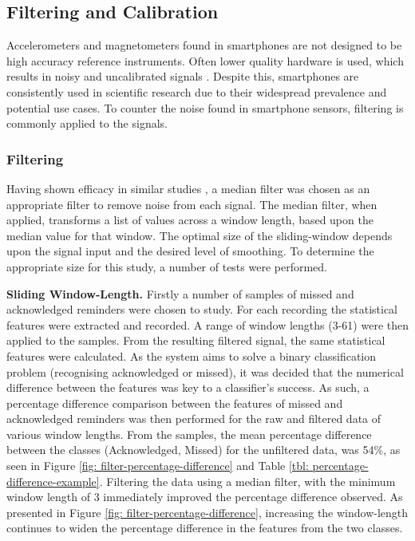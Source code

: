 \subsection{Filtering and Calibration}
Accelerometers and magnetometers found in smartphones are not designed to be high accuracy reference instruments. Often lower quality hardware is used, which results in noisy and uncalibrated signals \cite{Mitchell2013}. Despite this, smartphones are consistently used in scientific research due to their widespread prevalence and potential use cases. To counter the noise found in smartphone sensors, filtering is commonly applied to the signals.

\subsubsection{Filtering}
Having shown efficacy in similar studies \cite{Xia2011}, a median filter was chosen as an appropriate filter to remove noise from each signal. The median filter, when applied, transforms a list of values across a window length, based upon the median value for that window. The optimal size of the sliding-window depends upon the signal input and the desired level of smoothing.
To determine the appropriate size for this study, a number of tests were performed.

\textbf{Sliding Window-Length.}
Firstly a number of samples of missed and acknowledged reminders were chosen to study. For each recording the statistical features were extracted and recorded.
A range of window lengths (3-61) were then applied to the samples. From the resulting filtered signal, the same statistical features were calculated.
As the system aims to solve a binary classification problem (recognising acknowledged or missed), it was decided that the numerical difference between the features was key to a classifier's success. As such, a percentage difference comparison between the features of missed and acknowledged reminders was then performed for the raw and filtered data of various window lengths.
From the samples, the mean percentage difference between the classes (Acknowledged, Missed) for the unfiltered data, was 54\%, as seen in Figure \ref{fig: filter-percentage-difference} and Table \ref{tbl: percentage-difference-example}. Filtering the data using a median filter, with the minimum window length of 3 immediately improved the percentage difference observed. As presented in Figure \ref{fig: filter-percentage-difference}, increasing the window-length continues to widen the percentage difference in the features from the two classes.

